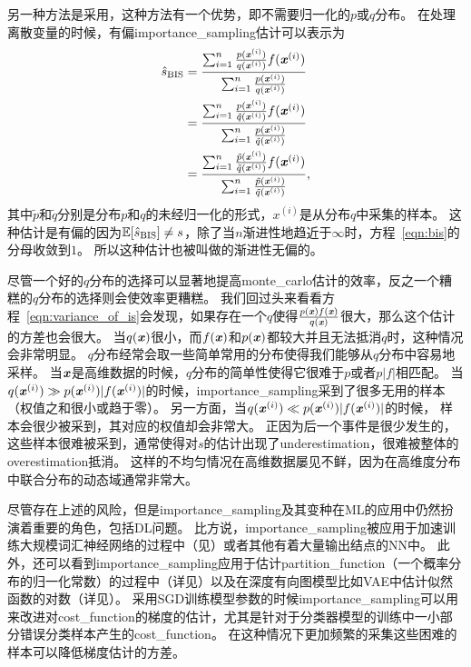 另一种方法是采用，这种方法有一个优势，即不需要归一化的$p$或$q$分布。
在处理离散变量的时候，有偏\gls{importance_sampling}估计可以表示为
\begin{align}
\label{eqn:bis}
\hat{s}_{\text{BIS}} & = \frac{\sum_{i=1}^{n} \frac{p(\boldsymbol{\mathit{x}}^{(i)})}{q(\boldsymbol{\mathit{x}}^{(i)})} f(\boldsymbol{\mathit{x}}^{(i)})}{\sum_{i=1}^{n}\frac{p(\boldsymbol{\mathit{x}}^{(i)})}{q(\boldsymbol{\mathit{x}}^{(i)})}} \\
& = \frac{\sum_{i=1}^{n} \frac{p(\boldsymbol{\mathit{x}}^{(i)})}{\tilde{q}(\boldsymbol{\mathit{x}}^{(i)})} f(\boldsymbol{\mathit{x}}^{(i)})}{\sum_{i=1}^{n}\frac{p(\boldsymbol{\mathit{x}}^{(i)})}{\tilde{q}(\boldsymbol{\mathit{x}}^{(i)})}} \\
& = \frac{\sum_{i=1}^{n} \frac{\tilde{p}(\boldsymbol{\mathit{x}}^{(i)})}{\tilde{q}(\boldsymbol{\mathit{x}}^{(i)})} f(\boldsymbol{\mathit{x}}^{(i)})}{\sum_{i=1}^{n}\frac{\tilde{p}(\boldsymbol{\mathit{x}}^{(i)})}{\tilde{q}(\boldsymbol{\mathit{x}}^{(i)})}},
\end{align}
其中$\tilde{p}$和$\tilde{q}$分别是分布${p}$和${q}$的未经归一化的形式，$x^{(i)}$是从分布${q}$中采集的样本。
这种估计是有偏的因为$\mathbb{E}[\hat{s}_{\text{BIS}}]\neq s$，除了当$n$渐进性地趋近于$\infty$时，方程~\eqref{eqn:bis}的分母收敛到$1$。
所以这种估计也被叫做的渐进性无偏的。

尽管一个好的$q$分布的选择可以显著地提高\gls{monte_carlo}估计的效率，反之一个糟糕的$q$分布的选择则会使效率更糟糕。
我们回过头来看看方程~\eqref{eqn:variance_of_is}会发现，如果存在一个$q$使得$\frac{p(\boldsymbol{\mathit{x}})f(\boldsymbol{\mathit{x}})}{q(\boldsymbol{\mathit{x}})}$很大，那么这个估计的方差也会很大。
当$q(\boldsymbol{\mathit{x}})$很小，而$f(\boldsymbol{\mathit{x}})$和$p(\boldsymbol{\mathit{x}})$都较大并且无法抵消$q$时，这种情况会非常明显。
$q$分布经常会取一些简单常用的分布使得我们能够从$q$分布中容易地采样。
当$\boldsymbol{\mathit{x}}$是高维数据的时候，$q$分布的简单性使得它很难于$p$或者$p\vert f\vert$相匹配。
当$q(\boldsymbol{\mathit{x}}^{(i)})\gg p(\boldsymbol{\mathit{x}}^{(i)}) \vert f(\boldsymbol{\mathit{x}}^{(i)})\vert $的时候，\gls{importance_sampling}采到了很多无用的样本（权值之和很小或趋于零）。
另一方面，当$q(\boldsymbol{\mathit{x}}^{(i)})\ll p(\boldsymbol{\mathit{x}}^{(i)}) \vert f(\boldsymbol{\mathit{x}}^{(i)})\vert $的时候， 样本会很少被采到，其对应的权值却会非常大。
正因为后一个事件是很少发生的，这些样本很难被采到，通常使得对$s$的估计出现了\gls{underestimation}，很难被整体的\gls{overestimation}抵消。
这样的不均匀情况在高维数据屡见不鲜，因为在高维度分布中联合分布的动态域通常非常大。

尽管存在上述的风险，但是\gls{importance_sampling}及其变种在\gls{ML}的应用中仍然扮演着重要的角色，包括\gls{DL}问题。
比方说，\gls{importance_sampling}被应用于加速训练大规模词汇神经网络的过程中（见）或者其他有着大量输出结点的\gls{NN}中。
此外，还可以看到\gls{importance_sampling}应用于估计\gls{partition_function}（一个概率分布的归一化常数）的过程中（详见）以及在深度有向图模型比如\gls{VAE}中估计似然函数的对数（详见）。
采用\gls{SGD}训练模型参数的时候\gls{importance_sampling}可以用来改进对\gls{cost_function}的梯度的估计，尤其是针对于分类器模型的训练中一小部分错误分类样本产生的\gls{cost_function}。
在这种情况下更加频繁的采集这些困难的样本可以降低梯度估计的方差\citep{Hinton06}。


